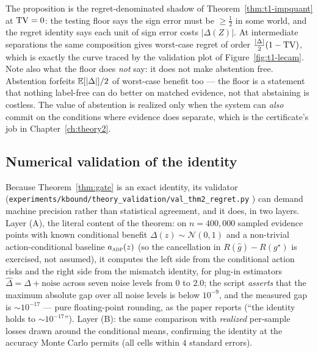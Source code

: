 \begin{remark}\label{rem:t1-floor}
The proposition is the regret-denominated shadow of
Theorem~\ref{thm:t1-impquant} at $\mathrm{TV}=0$: the testing floor says the sign
error must be $\ge\tfrac12$ in some world, and the regret identity says
each unit of sign error costs $|\Delta(Z)|$. At intermediate separations
the same composition gives worst-case regret of order
$\tfrac{|\Delta|}{2}(1-\mathrm{TV})$, which is exactly the curve traced by the
validation plot of Figure~\ref{fig:t1-lecam}. Note also what the floor does
\emph{not} say: it does not make abstention free. Abstention forfeits
$\mathbb{E}[|\Delta|]/2$ of worst-case benefit too --- the floor is a statement
that nothing label-free can do better on matched evidence, not that
abstaining is costless. The value of abstention is realized only when the
system can \emph{also} commit on the conditions where evidence does
separate, which is the certificate's job in Chapter~\ref{ch:theory2}.
\end{remark}

\subsection{Numerical validation of the identity}\label{sec:t1-gate-val}

Because Theorem~\ref{thm:gate} is an exact identity, its validator
(\texttt{experiments/kbound/theory\_validation/val\_thm2\_regret.py}
\cite{kbound2026repo}) can demand machine precision rather than
statistical agreement, and it does, in two layers. Layer (A), the literal
content of the theorem: on $n=400{,}000$ sampled evidence points with
known conditional benefit $\Delta(z)\sim\mathcal N(0,1)$ and a non-trivial
action-conditional baseline $a_{\textsc{adp}}(z)$ (so the cancellation in
$R(\widehat g)-R(g^\star)$ is exercised, not assumed), it computes the
left side from the conditional action risks and the right side from the
mismatch identity, for plug-in estimators
$\widehat\Delta=\Delta+\mathrm{noise}$ across seven noise levels from $0$
to $2.0$; the script \emph{asserts} that the maximum absolute gap over
all noise levels is below $10^{-9}$, and the measured gap is
${\sim}10^{-17}$ --- pure floating-point rounding, as the paper reports
(``the identity holds to ${\sim}10^{-17}$''). Layer (B): the same
comparison with \emph{realized} per-sample losses drawn around the
conditional means, confirming the identity at the accuracy Monte Carlo
permits (all cells within $4$ standard errors).

